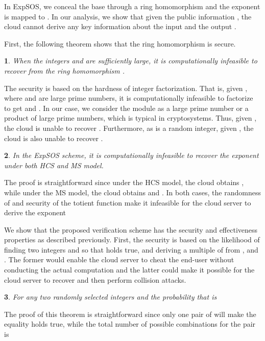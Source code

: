 \documentclass[english,draftcls,onecolumn,11pt]{IEEEtran}
\theoremstyle{definition}
\theoremstyle{plain}
\newtheorem{thm}{\protect\theoremname}
\theoremstyle{plain}
\theoremstyle{definition}
\providecommand{\theoremname}{Theorem}
\begin{document}
In ExpSOS, we conceal the base  through a ring homomorphism 
and the exponent  is mapped to . In our analysis,
we show that given the public information ,
the cloud cannot derive any key information about the input 
and the output .

First, the following theorem shows that the ring homomorphism is secure.
\begin{thm}
\label{thm:ring-security} When the integers  and  are sufficiently
large, it is computationally infeasible to recover  from the ring
homomorphism .\end{thm}
\begin{IEEEproof}
The security is based on the hardness of integer factorization. That
is, given , where  and  are large prime numbers, it
is computationally infeasible to factorize  to get  and .
In our case, we consider the module  as a large prime number or
a product of large prime numbers, which is typical in cryptosystems.
Thus, given , the cloud is unable to recover . Furthermore,
as  is a random integer, given , the cloud is
also unable to recover . \end{IEEEproof}
\begin{thm}
In the ExpSOS scheme, it is computationally infeasible to recover
the exponent  under both HCS and MS model.\end{thm}
\begin{IEEEproof}
The proof is straightforward since under the HCS model, the cloud
obtains , while under the MS model, the cloud obtains
 and . In
both cases, the randomness of  and security
of the totient function  make it infeasible for the cloud
server to derive the exponent 
\end{IEEEproof}
We show that the proposed verification scheme has the security and
effectiveness properties as described previously. First, the security
is based on the likelihood of finding two integers  and 
so that 
holds true, and deriving a multiple of  from ,
and . The former would enable the
cloud server to cheat the end-user without conducting the actual computation
and the latter could make it possible for the cloud server to recover
 and then perform collision attacks. 
\begin{thm}
For any two randomly selected integers  and  the
probability that 
is  \end{thm}
\begin{IEEEproof}
The proof of this theorem is straightforward since only one pair of
 will make the equality holds true, while the total
number of possible combinations for the  pair is  
\end{IEEEproof}
\end{document}

